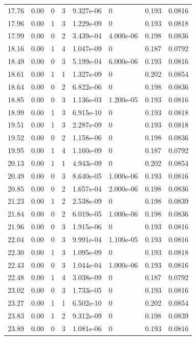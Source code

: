 \documentclass[preview]{standalone}
\begin{document}
{{{\begin{tabular}{L{1.2cm}C{1.2cm} C{0.3cm}C{0.5cm} C{1.4cm}C{1.4cm} C{1.4cm}C{1.4cm}}
  17.76  &  0.00  & 0     &  3 &  9.327e-06  & 0  & 0.193 &  0.0816   \\ 
  17.96  &  0.00  & 1     &  3 &  1.229e-09  & 0  & 0.193 &  0.0818   \\ 
  17.99  &  0.00  & 0     &  2 &  3.439e-04  & 4.000e-06  & 0.198 &  0.0836   \\ 
  18.16  &  0.00  & 1     &  4 &  1.047e-09  & 0  & 0.187 &  0.0792   \\ 
  18.49  &  0.00  & 0     &  3 &  5.199e-04  & 6.000e-06  & 0.193 &  0.0816   \\ 
  18.61  &  0.00  & 1     &  1 &  1.327e-09  & 0  & 0.202 &  0.0854   \\ 
  18.64  &  0.00  & 0     &  2 &  6.822e-06  & 0  & 0.198 &  0.0836   \\ 
  18.85  &  0.00  & 0     &  3 &  1.136e-03  & 1.200e-05  & 0.193 &  0.0816   \\ 
  18.99  &  0.00  & 1     &  3 &  6.915e-10  & 0  & 0.193 &  0.0818   \\ 
  19.51  &  0.00  & 1     &  3 &  2.287e-09  & 0  & 0.193 &  0.0818   \\ 
  19.52  &  0.00  & 0     &  2 &  1.158e-06  & 0  & 0.198 &  0.0836   \\ 
  19.95  &  0.00  & 1     &  4 &  1.160e-09  & 0  & 0.187 &  0.0792   \\ 
  20.13  &  0.00  & 1     &  1 &  4.943e-09  & 0  & 0.202 &  0.0854   \\ 
  20.49  &  0.00  & 0     &  3 &  8.640e-05  & 1.000e-06  & 0.193 &  0.0816   \\ 
  20.85  &  0.00  & 0     &  2 &  1.657e-04  & 2.000e-06  & 0.198 &  0.0836   \\ 
  21.23  &  0.00  & 1     &  2 &  2.538e-09  & 0  & 0.198 &  0.0839   \\ 
  21.84  &  0.00  & 0     &  2 &  6.019e-05  & 1.000e-06  & 0.198 &  0.0836   \\ 
  21.96  &  0.00  & 0     &  3 &  1.915e-06  & 0  & 0.193 &  0.0816   \\ 
  22.04  &  0.00  & 0     &  3 &  9.991e-04  & 1.100e-05  & 0.193 &  0.0816   \\ 
  22.30  &  0.00  & 1     &  3 &  1.095e-09  & 0  & 0.193 &  0.0818   \\ 
  22.43  &  0.00  & 0     &  3 &  1.044e-04  & 1.000e-06  & 0.193 &  0.0816   \\ 
  22.48  &  0.00  & 1     &  4 &  3.038e-09  & 0  & 0.187 &  0.0792   \\ 
  23.02  &  0.00  & 0     &  3 &  1.733e-05  & 0  & 0.193 &  0.0816   \\ 
  23.27  &  0.00  & 1     &  1 &  6.502e-10  & 0  & 0.202 &  0.0854   \\ 
  23.83  &  0.00  & 1     &  2 &  9.312e-09  & 0  & 0.198 &  0.0839   \\ 
  23.89  &  0.00  & 0     &  3 &  1.081e-06  & 0  & 0.193 &  0.0816   \\ 
\hline 
\end{tabular} 

}}}
\end{document}
